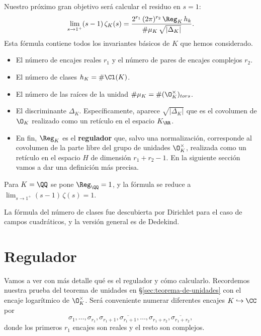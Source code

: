 Nuestro próximo gran objetivo será calcular el residuo en $s = 1$:
\[ \lim_{s \to 1^+} (s - 1)\,\zeta_K (s) =
   \frac{2^{r_1}\,(2\pi)^{r_2}\,\Reg_K\,h_k}{\#\mu_K\,\sqrt{|\Delta_K|}}. \]
Esta fórmula contiene todos los invariantes básicos de $K$ que hemos
considerado.
\begin{itemize}
\item El número de encajes reales $r_1$ y el número de pares de encajes
  complejos $r_2$.

\item El número de clases $h_K = \# \Cl (K)$.

\item El número de las raíces de la unidad $\# \mu_K = \# (\O_K^\times)_{tors}$.

\item El discriminante $\Delta_K$. Específicamente, aparece $\sqrt{|\Delta_K|}$
  que es el covolumen de $\O_K$ realizado como un retículo en el espacio
  $K_\RR$.

\item En fin, $\Reg_K$ es el \textbf{regulador} que, salvo una normalización,
  corresponde al covolumen de la parte libre del grupo de unidades
  $\O_K^\times$, realizada como un retículo en el espacio $H$ de dimensión
  $r_1 + r_2 - 1$. En la siguiente sección vamos a dar una definición más
  precisa.
\end{itemize}

Para $K = \QQ$ se pone $\Reg_\QQ = 1$, y la fórmula se reduce a
$\lim_{s \to 1^+} (s - 1)\,\zeta (s) = 1$.

\vspace{1em}

La fórmula del número de clases fue descubierta por Dirichlet para el caso de
campos cuadráticos, y la versión general es de Dedekind.


\section{Regulador}

Vamos a ver con más detalle qué es el regulador y cómo calcularlo.
Recordemos nuestra prueba del teorema de unidades en
\S\ref{sec:teorema-de-unidades} con el encaje logarítmico de $\O_K^\times$.
Será conveniente numerar diferentes encajes $K\hookrightarrow \CC$ por
$$\sigma_1,\ldots,\sigma_{r_1},\sigma_{r_1+1},\overline{\sigma_{r_1+1}},\ldots,\sigma_{r_1+r_2},\overline{\sigma_{r_1+r_2}},$$
donde los primeros $r_1$ encajes son reales y el resto son complejos.

